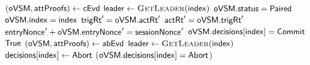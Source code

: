 \begin{algorithm}[H]
\begin{algorithmic}[1]
            \State $(\mathsf{oVSM}, \mathsf{attProofs}) \gets \mathsf{cEvd}$
            \State {}
            \State $\leader \gets \Call{GetLeader}{\idx}$
            \If{$\leader = \vsmid$}
                \State \require $\mathsf{oVSM}.\mathsf{status} = \mathsf{Paired}$ 
                \State \require $\mathsf{oVSM}.\mathsf{index} = \mathsf{index}$
                \State \require $\mathsf{trigRt}_{\mathsf{}}' = \mathsf{oVSM}.\mathsf{actRt}_{\mathsf{}}'$
                \State \require $\mathsf{actRt}_{\mathsf{}}' = \mathsf{oVSM}.\mathsf{trigRt}_{\mathsf{}}'$
                \State \require $\mathsf{entryNonce_{}}' + \mathsf{oVSM}.\mathsf{entryNonce_{}}' = \mathsf{sessionNonce_{}}'$
            \Else \; \require $\mathsf{oVSM}.\mathsf{decisions}[\mathsf{index}] = \mathsf{Commit}$
            \EndIf
            \State \Return $\mathsf{True}$
        \EndFunction
        \Statex
            \State $(\mathsf{oVSM}, \mathsf{attProofs}) \gets \mathsf{abEvd}$
            \State {}
            \State $\leader \gets \Call{GetLeader}{\idx}$
            \If{$\leader = \vsmid$}
                    \State {}
                \EndIf
                \State $\mathsf{decisions}[\mathsf{index}] \gets \mathsf{Abort}$
            \Else
                \State \require ($\mathsf{oVSM}.\mathsf{decisions}[\mathsf{index}] = \mathsf{Abort}$)
            \EndIf
        \EndFunction
        


    \end{algorithmic}
\end{algorithm}




